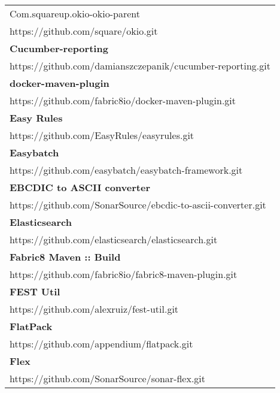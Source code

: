 \begin{table}[]
\begin{tabular}{|p{130mm}|}
Com.squareup.okio-okio-parent                      \\ https://github.com/square/okio.git                                           \\ \hline \bf
Cucumber-reporting                                 \\ https://github.com/damianszczepanik/cucumber-reporting.git                   \\ \hline \bf
docker-maven-plugin                                \\ https://github.com/fabric8io/docker-maven-plugin.git                         \\ \hline \bf
Easy Rules                                         \\ https://github.com/EasyRules/easyrules.git                                   \\ \hline \bf
Easybatch                                          \\ https://github.com/easybatch/easybatch-framework.git                         \\ \hline \bf
EBCDIC to ASCII converter                          \\ https://github.com/SonarSource/ebcdic-to-ascii-converter.git                 \\ \hline \bf
Elasticsearch                                      \\ https://github.com/elasticsearch/elasticsearch.git                           \\ \hline \bf
Fabric8 Maven :: Build                             \\ https://github.com/fabric8io/fabric8-maven-plugin.git                        \\ \hline \bf
FEST Util                                          \\ https://github.com/alexruiz/fest-util.git                                    \\ \hline \bf
FlatPack                                           \\ https://github.com/appendium/flatpack.git                                    \\ \hline \bf
Flex                                               \\ https://github.com/SonarSource/sonar-flex.git                                \\ \hline
\end{tabular}
\end{table}


